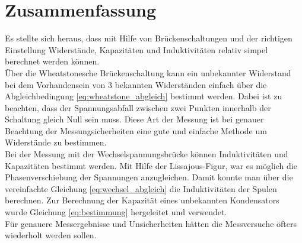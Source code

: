\documentclass[a4paper,usenatbib]{aspdoc}
\begin{document}
    \section{Zusammenfassung}\label{sec:conclusion}
        Es stellte sich heraus, dass mit Hilfe von Brückenschaltungen und der richtigen Einstellung Widerstände, Kapazitäten und Induktivitäten relativ simpel berechnet werden können.\\
        Über die Wheatstonesche Brückenschaltung kann ein unbekannter Widerstand bei dem Vorhandensein von 3 bekannten Widerständen einfach über die Abgleichbedingung \ref{eq:wheatstone_abgleich} bestimmt werden. Dabei ist zu beachten, dass der Spannungsabfall zwischen zwei Punkten innerhalb der Schaltung gleich Null sein muss. Diese Art der Messung ist bei genauer Beachtung der Messungsicherheiten eine gute und einfache Methode um Widerstände zu bestimmen.\\ 
        Bei der Messung mit der Wechselspannungsbrücke können Induktivitäten und Kapazitäten bestimmt werden. Mit Hilfe der Lissajous-Figur, war es möglich die Phasenverschiebung der Spannungen anzugleichen. Damit konnte man über die vereinfachte Gleichung \ref{eq:wechsel_abgleich} die Induktivitäten der Spulen berechnen. Zur Berechnung der Kapazität eines unbekannten Kondensators wurde Gleichung \ref{eq:bestimmung} hergeleitet und verwendet.\\
        Für genauere Messergebnisse und Unsicherheiten hätten die Messversuche öfters wiederholt werden sollen. 
        
    
    
    


    \appendix
\end{document}

